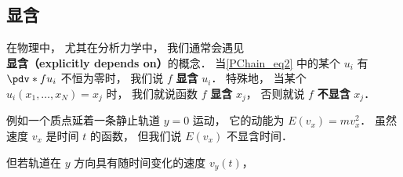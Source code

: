 \subsection{显含}
在物理中， 尤其在分析力学中， 我们通常会遇见\textbf{显含（explicitly depends on）}的概念． 当\autoref{PChain_eq2} 中的某个 $u_i$ 有 $\pdv*{f}{u_i}$ 不恒为零时， 我们说 $f$ \textbf{显含} $u_i$． 特殊地， 当某个 $u_i(x_1, \dots, x_N) = x_j$ 时， 我们就说函数 $f$ \textbf{显含} $x_j$， 否则就说 $f$ \textbf{不显含} $x_j$．

\begin{example}{}
例如一个质点延着一条静止轨道 $y = 0$ 运动， 它的动能为 $E(v_x) = m v_x^2$． 虽然速度 $v_x$ 是时间 $t$ 的函数， 但我们说 $E(v_x)$ 不显含时间．

但若轨道在 $y$ 方向具有随时间变化的速度 $v_y(t)$， 
\end{example}
